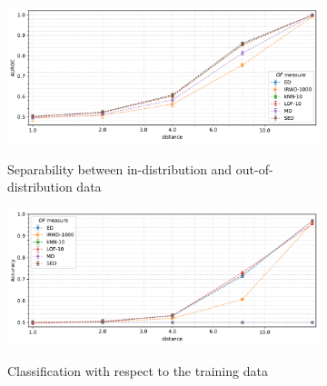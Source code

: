 \begin{figure}[t]
    \centering
    \begin{subfigure}[b]{0.9\textwidth}
        \centering
        \caption{\small Separability between in-distribution and out-of-distribution data}
        \includegraphics[width=\textwidth]{images/distributions/trends-h/trend-distributions-auroc(distance)-dimension_750-samples_2500-distribution_gaussian-model_ED,IRWD-1000,kNN-10,LOF-10,MD,SED-aggregated.pdf}
        \label{fig:distance-auroc}
    \end{subfigure}
    \begin{subfigure}[b]{0.9\textwidth}
        \centering
        \caption{\small Classification with respect to the training data}
        \includegraphics[width=\textwidth]{images/distributions/trends-h/trend-distributions-accuracy_95(distance)-dimension_750-samples_2500-distribution_gaussian-model_ED,IRWD-1000,kNN-10,LOF-10,MD,SED-aggregated.pdf}
        \label{fig:distance-accuracy}
    \end{subfigure}
    \begin{subfigure}[b]{0.495\textwidth}

\end{subfigure}
\end{figure}
